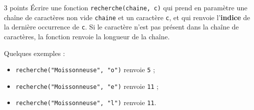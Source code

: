 \documentclass[a4paper,dvipsnames]{article}
\begin{document}
\medskip

\begin{exercice}{3 points}{}
  Écrire une fonction \texttt{recherche(chaine, c)} qui prend en paramètre une chaîne de caractères non vide \texttt{chaine} et un caractère \texttt{c}, et qui renvoie l'\textbf{indice} de la dernière occurrence de \texttt{c}. Si le caractère n'est pas présent dans la chaîne de caractères, la fonction renvoie la longueur de la chaîne.

  \tcblower

  Quelques exemples :

  \begin{itemize}
    \item \texttt{recherche("Moissonneuse", "o")} renvoie \texttt{5} ;
    \item \texttt{recherche("Moissonneuse", "e")} renvoie \texttt{11} ;
    \item \texttt{recherche("Moissonneuse", "l")} renvoie \texttt{11}.
  \end{itemize}
\end{exercice}
\end{document}
